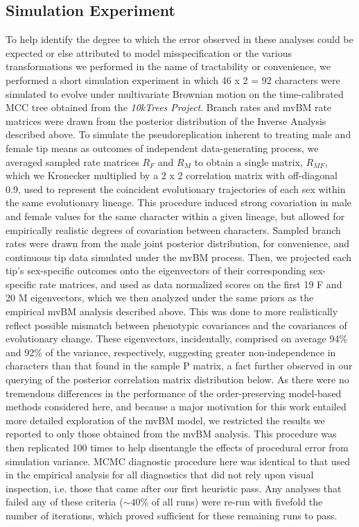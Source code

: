 \subsection{Simulation Experiment}
To help identify the degree to which the error observed in these analyses could be expected or else attributed to model misspecification or the various transformations we performed in the name of tractability or convenience, we performed a short simulation experiment in which 46 x 2 = 92 characters were simulated to evolve under multivariate Brownian motion on the time-calibrated MCC tree obtained from the \emph{10kTrees Project}. Branch rates and mvBM rate matrices were drawn from the posterior distribution of the Inverse Analysis described above. To simulate the pseudoreplication inherent to treating male and female tip means as outcomes of independent data-generating process, we averaged sampled rate matrices $R_{F}$ and $R_{M}$ to obtain a single matrix, $R_{MF}$, which we Kronecker multiplied by a 2 x 2 correlation matrix with off-diagonal 0.9, used to represent the coincident evolutionary trajectories of each sex within the same evolutionary lineage. This procedure induced strong covariation in male and female values for the same character within a given lineage, but allowed for empirically realistic degrees of covariation between characters. Sampled branch rates were drawn from the male joint posterior distribution, for convenience, and continuous tip data simulated under the mvBM process. Then, we projected each tip's sex-specific outcomes onto the eigenvectors of their corresponding sex-specific rate matrices, and used as data normalized scores on the first 19 F and 20 M eigenvectors, which we then analyzed under the same priors as the empirical mvBM analysis described above. This was done to more realistically reflect possible mismatch between phenotypic covariances and the covariances of evolutionary change. These eigenvectors, incidentally, comprised on average 94\% and 92\% of the variance, respectively, suggesting greater non-independence in characters than that found in the sample P matrix, a fact further observed in our querying of the posterior correlation matrix distribution below. As there were no tremendous differences in the performance of the order-preserving model-based methods considered here, and because a major motivation for this work entailed more detailed exploration of the mvBM model, we restricted the results we reported to only those obtained from the mvBM analysis. This procedure was then replicated 100 times to help disentangle the effects of procedural error from simulation variance. MCMC diagnostic procedure here was identical to that used in the empirical analysis for all diagnostics that did not rely upon visual inspection, i.e. those that came after our first heuristic pass. Any analyses that failed any of these criteria ($\sim40$\% of all runs) were re-run with fivefold the number of iterations, which proved sufficient for these remaining runs to pass.

